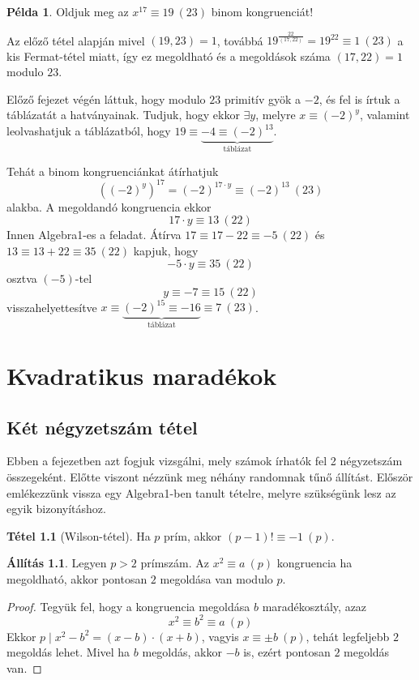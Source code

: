 \documentclass[12pt]{book}
\theoremstyle{plain} %
\theoremstyle{definition} %
\newtheorem{all/}{Állítás}[section]
\newenvironment{all}
{\renewcommand{\qedsymbol}{$\clubsuit$}%
	\pushQED{\qed}\begin{all/}}
	{\popQED\end{all/}}
\newtheorem{pl}{Példa}[section]
\newtheorem{theo/}{Tétel}[section]
\newenvironment{theo}
  {\renewcommand{\qedsymbol}{$\clubsuit$}%
   \pushQED{\qed}\begin{theo/}}
  {\popQED\end{theo/}}
\theoremstyle{remark}
\renewcommand\qedsymbol{$\blacksquare$}
\numberwithin{equation}{section}  %
\begin{document}
	\begin{pl}
		Oldjuk meg az $x^{17} \equiv 19\ (23)$ binom kongruenciát!
		
		Az előző tétel alapján mivel $(19,23)=1$, továbbá $19^{\frac{22}{(17,22)}} = 19^{22} \equiv 1\ (23)$ a kis Fermat-tétel miatt, így ez megoldható és a megoldások száma $(17,22)=1$ modulo $23$.
		
		Előző fejezet végén láttuk, hogy modulo $23$ primitív gyök a $-2$, és fel is írtuk a táblázatát a hatványainak. Tudjuk, hogy ekkor $\exists y$, melyre $x\equiv (-2)^y$, valamint leolvashatjuk a táblázatból, hogy $19\equiv \underbrace{-4\equiv (-2)^{13} }_{\text{táblázat}} $.
		
		Tehát a binom kongruenciánkat átírhatjuk
		\[ ((-2)^y)^{17} = (-2)^{17\cdot y} \equiv (-2)^{13}\ (23)  \]
		alakba. A megoldandó kongruencia ekkor
		\[ 17\cdot y \equiv 13\ (22)  \]
		Innen Algebra1-es a feladat. Átírva $17\equiv 17-22 \equiv -5\ (22)$ és $13 \equiv 13+22 \equiv 35\ (22) $ kapjuk, hogy
		\[ -5 \cdot y \equiv 35\ (22)  \]
		osztva $(-5)$-tel
		\[ y \equiv -7 \equiv 15\ (22)  \]
		visszahelyettesítve $x \equiv \underbrace{(-2)^{15} \equiv  -16}_{\text{táblázat}} \equiv 7\ (23) $.
	\end{pl}

	\chapter{Kvadratikus maradékok}
	
	\section{Két négyzetszám tétel}
	
	Ebben a fejezetben azt fogjuk vizsgálni, mely számok írhatók fel 2 négyzetszám összegeként. Előtte viszont nézzünk meg néhány randomnak tűnő állítást. Először emlékezzünk vissza egy Algebra1-ben tanult tételre, melyre szükségünk lesz az egyik bizonyításhoz.
	
	\begin{theo}[Wilson-tétel]
		Ha $p$ prím, akkor $(p-1)!\equiv -1\ (p)$.
	\end{theo}
	
	\begin{all}
		Legyen $p>2$ prímszám. Az $x^2\equiv a\ (p)$ kongruencia ha megoldható, akkor pontosan $2$ megoldása van modulo $p$.
	\end{all}

	\begin{proof}
		Tegyük fel, hogy a kongruencia megoldása $b$ maradékosztály, azaz
		\[ x^2\equiv b^2 \equiv a\ (p)  \]
		Ekkor $p\mid x^2-b^2 = (x-b)\cdot (x+b)$, vagyis $x\equiv \pm b\ (p)$, tehát legfeljebb $2$ megoldás lehet. Mivel ha $b$ megoldás, akkor $-b$ is, ezért pontosan $2$ megoldás van.
	\end{proof}
\end{document}
